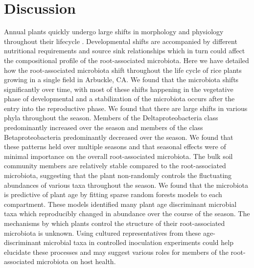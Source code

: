 \section{Discussion}
Annual plants quickly undergo large shifts in morphology and physiology throughout their lifecycle \cite{Freeling1990,Moldenhauer}. Developmental shifts are accompanied by different nutritional requirements and source sink relationships \cite{Ishimaru2013,Tegeder2010} which in turn could affect the compositional profile of the root-associated microbiota. Here we have detailed how the root-associated microbiota shift throughout the life cycle of rice plants growing in a single field in Arbuckle, CA. We found that the microbiota shifts significantly over time, with most of these shifts happening in the vegetative phase of developmental and a stabilization of the microbiota occurs after the entry into the reproductive phase. We found that there are large shifts in various phyla throughout the season. Members of the Deltaproteobacteria class predominantly increased over the season and members of the class Betaproteobacteria predominantly decreased over the season. We found that these patterns held over multiple seasons and that seasonal effects were of minimal importance on the overall root-associated microbiota. The bulk soil community members are relatively stable compared to the root-associated microbiota, suggesting that the plant non-randomly controls the fluctuating abundances of various taxa throughout the season. We found that the microbiota is predictive of plant age by fitting sparse random forests models to each compartment. These models identified many plant age discriminant microbial taxa which reproducibly changed in abundance over the course of the season. The mechanisms by which plants control the structure of their root-associated microbiota is unknown. Using cultured representatives from these age-discriminant microbial taxa in controlled inoculation experiments could help elucidate these processes and may suggest various roles for members of the root-associated microbiota on host health. 

